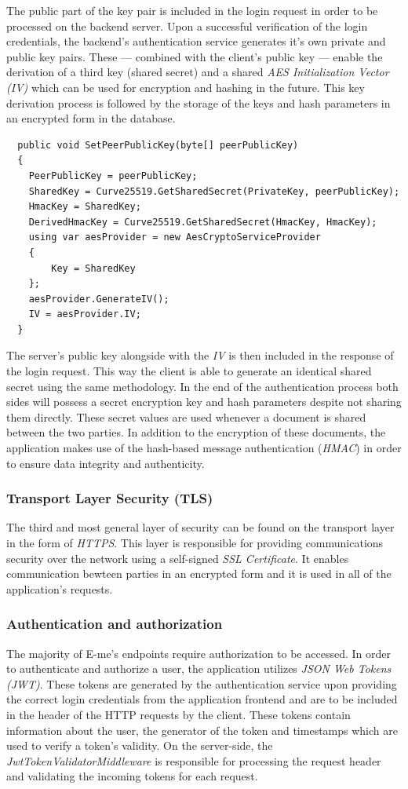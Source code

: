 The public part of the key pair is included in the login request in order to be processed on the backend server.
Upon a successful verification of the login credentials, the backend's authentication service generates it's own private and public key pairs.
These --- combined with the client's public key --- enable the derivation of a third key (shared secret) and a shared \emph{AES Initialization Vector (IV)} which can be used for encryption and hashing in the future.
This key derivation process is followed by the storage of the keys and hash parameters in an encrypted form in the database.

\begin{lstlisting}
  public void SetPeerPublicKey(byte[] peerPublicKey)
  {
	PeerPublicKey = peerPublicKey;
	SharedKey = Curve25519.GetSharedSecret(PrivateKey, peerPublicKey);
	HmacKey = SharedKey;
	DerivedHmacKey = Curve25519.GetSharedSecret(HmacKey, HmacKey);
	using var aesProvider = new AesCryptoServiceProvider
	{
		Key = SharedKey
	};
	aesProvider.GenerateIV();
	IV = aesProvider.IV;
  }
\end{lstlisting}

The server's public key alongside with the \emph{IV} is then included in the response of the login request.
This way the client is able to generate an identical shared secret using the same methodology.
In the end of the authentication process both sides will possess a secret encryption key and hash parameters despite not sharing them directly.
These secret values are used whenever a document is shared between the two parties.
In addition to the encryption of these documents, the application makes use of the hash-based message authentication (\emph{HMAC}) in order to 
ensure data integrity and authenticity.

\subsubsection{Transport Layer Security (TLS)}

The third and most general layer of security can be found on the transport layer in the form of \emph{HTTPS}.
This layer is responsible for providing communications security over the network using a self-signed \emph{SSL Certificate}.
It enables communication bewteen parties in an encrypted form and it is used in all of the application's requests.

\subsubsection{Authentication and authorization}

The majority of E-me's endpoints require authorization to be accessed.
In order to authenticate and authorize a user, the application utilizes \emph{JSON Web Tokens (JWT)}.
These tokens are generated by the authentication service upon providing the correct login credentials from the application frontend and are to be
included in the header of the HTTP requests by the client.
These tokens contain information about the user, the generator of the token and timestamps which are used to verify a token's validity.
On the server-side, the \emph{JwtTokenValidatorMiddleware} is responsible for processing the request header and validating the incoming tokens for each request.